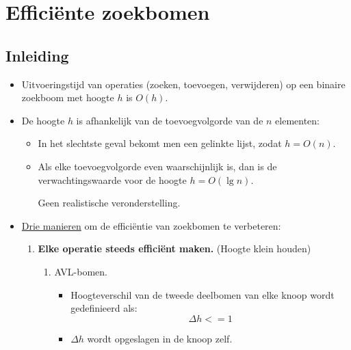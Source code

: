 \chapter{Efficiënte zoekbomen}
\section{Inleiding}
\begin{itemize}
    \item Uitvoeringstijd van operaties (zoeken, toevoegen, verwijderen) op een binaire zoekboom met hoogte $h$ is $O(h)$.
    \item De hoogte $h$ is afhankelijk van de toevoegvolgorde van de $n$ elementen:
    \begin{itemize}
        \item In het slechtste geval bekomt men een gelinkte lijst, zodat $h = O(n)$.
        \item Als elke toevoegvolgorde even waarschijnlijk is, dan is de verwachtingswaarde voor de hoogte $h = O(\lg n)$.
        \begin{itemize}
            \alert Geen realistische veronderstelling.
        \end{itemize}
    \end{itemize}
    \item \underline{Drie manieren} om de efficiëntie van zoekbomen te verbeteren:
    \begin{enumerate}
        \item \textbf{Elke operatie steeds efficiënt maken.} (Hoogte klein houden)
        \begin{enumerate}
            \item AVL-bomen. %
            \begin{itemize}
                \item Hoogteverschil van de tweede deelbomen van elke knoop wordt gedefinieerd als:
                $$\Delta h <= 1$$
                \item $\Delta h$ wordt opgeslagen in de knoop zelf.


\end{itemize}
\end{enumerate}
\end{enumerate}
\end{itemize}
